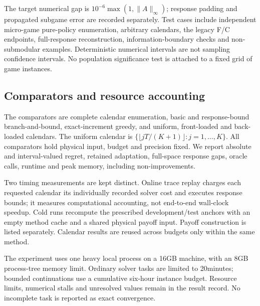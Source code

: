 The target numerical gap is $10^{-6}\max(1,\|A\|_\infty)$; response
padding and propagated subgame error are recorded separately. Test cases
include independent micro-game pure-policy enumeration, arbitrary calendars,
the legacy F/C endpoints, full-response reconstruction, information-boundary
checks and non-submodular examples. Deterministic numerical intervals are
not sampling confidence intervals. No population significance test is
attached to a fixed grid of game instances.

\subsection{Comparators and resource accounting}
The comparators are complete calendar enumeration, basic and response-bound
branch-and-bound, exact-increment greedy, and uniform, front-loaded and
back-loaded calendars. The uniform calendar is
$\{\lfloor jT/(K+1)\rfloor:j=1,\ldots,K\}$.
All comparators hold physical input, budget and precision fixed. We report
absolute and interval-valued regret, retained adaptation, full-space response
gaps, oracle calls, runtime and peak memory, including non-improvements.

Two timing measurements are kept distinct. Online trace replay charges
each requested calendar its individually recorded solver cost and executes
response bounds; it measures computational accounting, not end-to-end
wall-clock speedup. Cold runs recompute the prescribed development/test
anchors with an empty method cache and a shared physical payoff input.
Payoff construction is listed separately. Calendar results are reused across
budgets only within the same method.

The experiment uses one heavy local process on a 16GB machine, with an 8GB
process-tree memory limit. Ordinary solver tasks are limited to 20minutes;
bounded continuations use a cumulative six-hour instance budget. Resource
limits, numerical stalls and unresolved values remain in the result record.
No incomplete task is reported as exact convergence.
